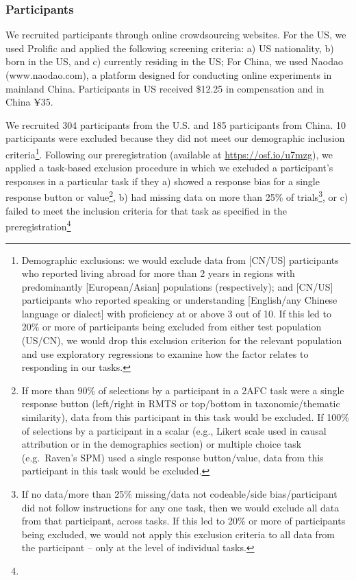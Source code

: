 \documentclass[
  man,floatsintext]{apa6}
\begin{document}
\hypertarget{participants-1}{%
\subsubsection{Participants}\label{participants-1}}

We recruited participants through online crowdsourcing websites. For the US, we used Prolific and applied the following screening criteria: a) US nationality, b) born in the US, and c) currently residing in the US; For China, we used Naodao (www.naodao.com), a platform designed for conducting online experiments in mainland China. Participants in US received \$12.25 in compensation and in China ¥35.

We recruited 304 participants from the U.S. and 185 participants from China. 10 participants were excluded because they did not meet our demographic inclusion criteria\footnote{
  Demographic exclusions: we would exclude data from {[}CN/US{]} participants who reported living abroad for more than 2 years in regions with predominantly {[}European/Asian{]} populations (respectively); and {[}CN/US{]} participants who reported speaking or understanding {[}English/any Chinese language or dialect{]} with proficiency at or above 3 out of 10. If this led to 20\% or more of participants being excluded from either test population (US/CN), we would drop this exclusion criterion for the relevant population and use exploratory regressions to examine how the factor relates to responding in our tasks.}. Following our preregistration (available at \url{https://osf.io/u7mzg}), we applied a task-based exclusion procedure in which we excluded a participant's responses in a particular task if they a) showed a response bias for a single response button or value\footnote{
  If more than 90\% of selections by a participant in a 2AFC task were a single response button (left/right in RMTS or top/bottom in taxonomic/thematic similarity), data from this participant in this task would be excluded. If 100\% of selections by a participant in a scalar (e.g., Likert scale used in causal attribution or in the demographics section) or multiple choice task (e.g.~Raven's SPM) used a single response button/value, data from this participant in this task would be excluded.}, b) had missing data on more than 25\% of trials\footnote{
  If no data/more than 25\% missing/data not codeable/side bias/participant did not follow instructions for any one task, then we would exclude all data from that participant, across tasks. If this led to 20\% or more of participants being excluded, we would not apply this exclusion criteria to all data from the participant -- only at the level of individual tasks.}, or c) failed to meet the inclusion criteria for that task as specified in the preregistration\footnote{
}
\end{document}
